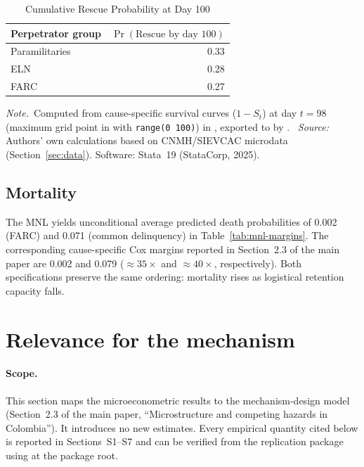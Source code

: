 \documentclass[12pt]{article}
\numberwithin{equation}{section}
\numberwithin{table}{section}
\newcommand{\tabnote}{\par\addvspace{0.4em}\noindent\emph{Note.}}
\newcommand{\tabsource}{\ \textit{Source:} Authors' own calculations based on
CNMH/SIEVCAC microdata (Section~\ref{sec:data}). Software: Stata~19
(StataCorp, 2025).}
\begin{document}
\begin{table}[t]
\centering
\caption{Cumulative Rescue Probability at Day 100}
\label{tab:cox-cumul}
\small
\begin{tabular}{@{}lr@{}}
\toprule
Perpetrator group & $\Pr(\text{Rescue by day 100})$ \\
\midrule
Paramilitaries & 0.33 \\
ELN & 0.28 \\
FARC & 0.27 \\
\bottomrule
\end{tabular}
\tabnote\ Computed from cause-specific survival curves ($1-S_t$) at day
$t=98$ (maximum grid point in  with \texttt{range(0 100)}) in
, exported to
 by .
\tabsource
\end{table}

\subsection{Mortality}

The MNL yields unconditional average predicted death probabilities of 0.002
(FARC) and 0.071 (common delinquency) in Table~\ref{tab:mnl-margins}. The
corresponding cause-specific Cox margins reported in Section~2.3 of the main
paper are 0.002 and 0.079 (${\approx}35\times$ and ${\approx}40\times$,
respectively). Both specifications preserve the same ordering: mortality rises
as logistical retention capacity falls.

\section{Relevance for the mechanism}
\label{sec:relevance}

\paragraph{Scope.}
This section maps the microeconometric results to the mechanism-design model
(Section~2.3 of the main paper, ``Microstructure and competing hazards in
Colombia''). It introduces no new estimates. Every empirical quantity cited
below is reported in Sections~S1--S7 and can be verified from the replication
package using  at the package root.
\end{document}
